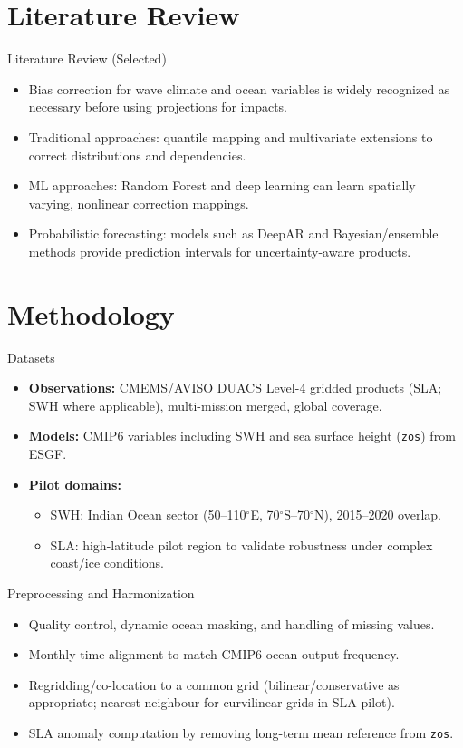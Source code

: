 \documentclass[aspectratio=169,11pt]{beamer}
\begin{document}
\section{Literature Review}

\begin{frame}{Literature Review (Selected)}
  \begin{itemize}
    \item Bias correction for wave climate and ocean variables is widely recognized as necessary before using projections for impacts.
    \item Traditional approaches: quantile mapping and multivariate extensions to correct distributions and dependencies.
    \item ML approaches: Random Forest and deep learning can learn spatially varying, nonlinear correction mappings.
    \item Probabilistic forecasting: models such as DeepAR and Bayesian/ensemble methods provide prediction intervals for uncertainty-aware products.
  \end{itemize}
\end{frame}

\section{Methodology}

\begin{frame}{Datasets}
  \begin{itemize}
    \item \textbf{Observations:} CMEMS/AVISO DUACS Level-4 gridded products (SLA; SWH where applicable), multi-mission merged, global coverage.
    \item \textbf{Models:} CMIP6 variables including SWH and sea surface height (\texttt{zos}) from ESGF.
    \item \textbf{Pilot domains:}
      \begin{itemize}
        \item SWH: Indian Ocean sector (50--110$^\circ$E, 70$^\circ$S--70$^\circ$N), 2015--2020 overlap.
        \item SLA: high-latitude pilot region to validate robustness under complex coast/ice conditions.
      \end{itemize}
  \end{itemize}
\end{frame}

\begin{frame}{Preprocessing and Harmonization}
  \begin{itemize}
    \item Quality control, dynamic ocean masking, and handling of missing values.
    \item Monthly time alignment to match CMIP6 ocean output frequency.
    \item Regridding/co-location to a common grid (bilinear/conservative as appropriate; nearest-neighbour for curvilinear grids in SLA pilot).
    \item SLA anomaly computation by removing long-term mean reference from \texttt{zos}.
  \end{itemize}
\end{frame}
\end{document}
